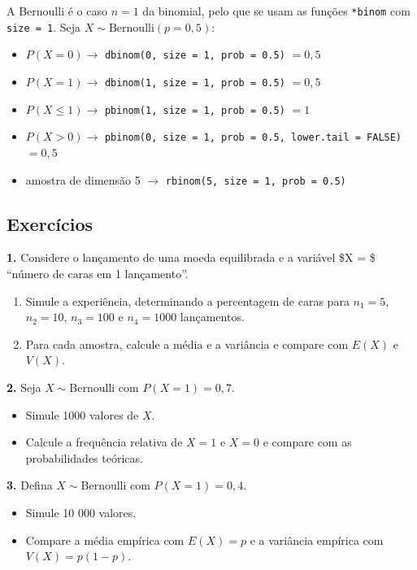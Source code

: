 \documentclass[
  portuguese,
  11pt,
  openany]{book}
\providecommand{\tightlist}{%
  \setlength{\itemsep}{0pt}\setlength{\parskip}{0pt}}
\begin{document}
A Bernoulli é o caso \(n = 1\) da binomial, pelo que se usam as funções \texttt{*binom} com
\texttt{size\ =\ 1}. Seja \(X \sim \text{Bernoulli}(p = 0{,}5)\):

\begin{itemize}
\tightlist
\item
  \(P(X = 0) \to\) \texttt{dbinom(0,\ size\ =\ 1,\ prob\ =\ 0.5)} \(= 0{,}5\)
\item
  \(P(X = 1) \to\) \texttt{dbinom(1,\ size\ =\ 1,\ prob\ =\ 0.5)} \(= 0{,}5\)
\item
  \(P(X \leq 1) \to\) \texttt{pbinom(1,\ size\ =\ 1,\ prob\ =\ 0.5)} \(= 1\)
\item
  \(P(X > 0) \to\) \texttt{pbinom(0,\ size\ =\ 1,\ prob\ =\ 0.5,\ lower.tail\ =\ FALSE)} \(= 0{,}5\)
\item
  amostra de dimensão 5 \(\to\) \texttt{rbinom(5,\ size\ =\ 1,\ prob\ =\ 0.5)}
\end{itemize}

\subsection{Exercícios}\label{exercuxedcios-26}

\textbf{1.} Considere o lançamento de uma moeda equilibrada e a variável \$X = \$ ``número de
caras em 1 lançamento''.

\begin{enumerate}
\def\labelenumi{(\alph{enumi})}
\tightlist
\item
  Simule a experiência, determinando a percentagem de caras para \(n_1 = 5\),
  \(n_2 = 10\), \(n_3 = 100\) e \(n_4 = 1000\) lançamentos.
\item
  Para cada amostra, calcule a média e a variância e compare com \(E(X)\) e \(V(X)\).
\end{enumerate}

\textbf{2.} Seja \(X \sim \text{Bernoulli}\) com \(P(X = 1) = 0{,}7\).

\begin{itemize}
\tightlist
\item
  Simule 1000 valores de \(X\).
\item
  Calcule a frequência relativa de \(X = 1\) e \(X = 0\) e compare com as probabilidades
  teóricas.
\end{itemize}

\textbf{3.} Defina \(X \sim \text{Bernoulli}\) com \(P(X = 1) = 0{,}4\).

\begin{itemize}
\tightlist
\item
  Simule 10 000 valores.
\item
  Compare a média empírica com \(E(X) = p\) e a variância empírica com \(V(X) = p(1-p)\).
\end{itemize}
\end{document}
